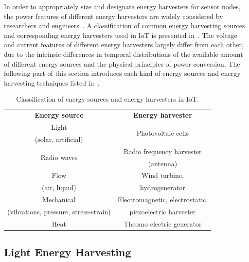 In order to appropriately size and designate energy harvesters for sensor nodes, the power features of different energy harvesters are widely considered by researchers and engineers~\cite{moss2015scaling}. A classification of common energy harvesting sources and corresponding energy harvesters used in IoT is presented in~. The voltage and current features of different energy harvesters largely differ from each other, due to the intrinsic differences in temporal distributions of the available amount of different energy sources and the physical principles of power conversion. The following part of this section introduces each kind of energy sources and energy harvesting techniques listed in~.

\begin{table}[!htb]
    \centering
    \begin{tabular}{|c|c|}
    \toprule
    \multirow{2}{*}{\textbf{Energy source}} & \multirow{2}{*}{\textbf{Energy harvester}} \\
     & \\ 
    \midrule
    Light & \multirow{2}{*}{Photovoltaic cells} \\
    (solar, artificial) & \\ 
    \midrule
    \multirow{2}{*}{Radio waves} & Radio frequency harvester \\ 
    & (antenna) \\ 
    \midrule
    Flow & Wind turbine, \\ 
    (air, liquid) & hydrogenerator \\ 
    \midrule
    Mechanical & Electromagnetic, electrostatic, \\ 
    (vibrations, pressure, stress-strain) & piezoelectric harvester \\ 
    \midrule
    \multirow{2}{*}{Heat} & \multirow{2}{*}{Theomo electric generator} \\
     & \\  
    \bottomrule
    \end{tabular}
    \caption{Classification of energy sources and energy harvesters in IoT.}
    \label{Table:energysources}
\end{table}

\subsection{Light Energy Harvesting}

